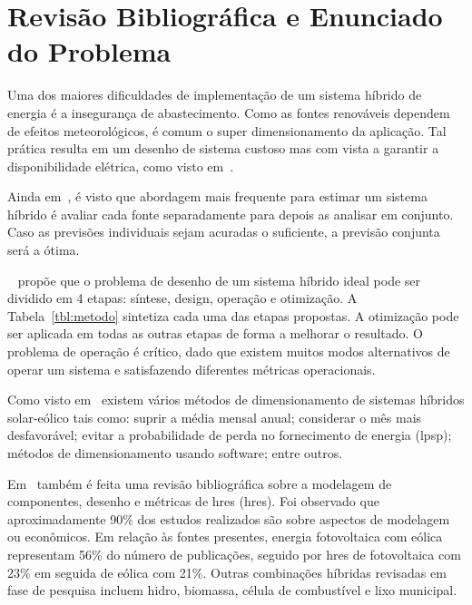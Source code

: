\clearpage

\section{Revisão Bibliográfica e Enunciado do Problema}

Uma dos maiores dificuldades de implementação de um sistema híbrido de energia é
a insegurança de abastecimento. Como as fontes renováveis dependem de efeitos
meteorológicos, é comum o super dimensionamento da aplicação.  Tal prática
resulta em um desenho de sistema custoso mas com vista a garantir a
disponibilidade elétrica, como visto em~\cite{Deshmukh_2008}.

Ainda em~\cite{Deshmukh_2008}, é visto que abordagem mais frequente para estimar um sistema
híbrido é avaliar cada fonte separadamente para depois as analisar em conjunto.
Caso as previsões individuais sejam acuradas o suficiente, a previsão conjunta
será a ótima.

~\cite[cap. 3]{kaldellis_2010} propõe que o problema de desenho de um sistema
híbrido ideal pode ser dividido em 4 etapas: síntese, design, operação e
otimização. A Tabela~\ref{tbl:metodo} sintetiza cada uma das etapas propostas. A
otimização pode ser aplicada em todas as outras etapas de forma a melhorar o
resultado. O problema de operação é crítico, dado que existem muitos modos
alternativos de operar um sistema e satisfazendo diferentes métricas
operacionais.



Como visto em~\cite{Kusakana_2013} existem vários métodos de dimensionamento de
sistemas híbridos solar-eólico tais como: suprir a média mensal anual;
considerar o mês mais desfavorável; evitar a probabilidade de perda no
fornecimento de energia (\acrshort{lpsp}); métodos de dimensionamento usando
software; entre outros.

Em~\cite{Deshmukh_2008} também é feita uma revisão bibliográfica sobre a
modelagem de componentes, desenho e métricas de \acrlong{hres}
(\acrshort{hres}).  Foi observado que aproximadamente 90\% dos estudos
realizados são sobre aspectos de modelagem ou econômicos.  Em relação às fontes
presentes, energia fotovoltaica com eólica representam 56\% do número de
publicações, seguido por \acrshort{hres} de fotovoltaica com 23\% em seguida de
eólica com 21\%.  Outras combinações híbridas revisadas em fase de pesquisa
incluem hidro, biomassa, célula de combustível e lixo municipal.

